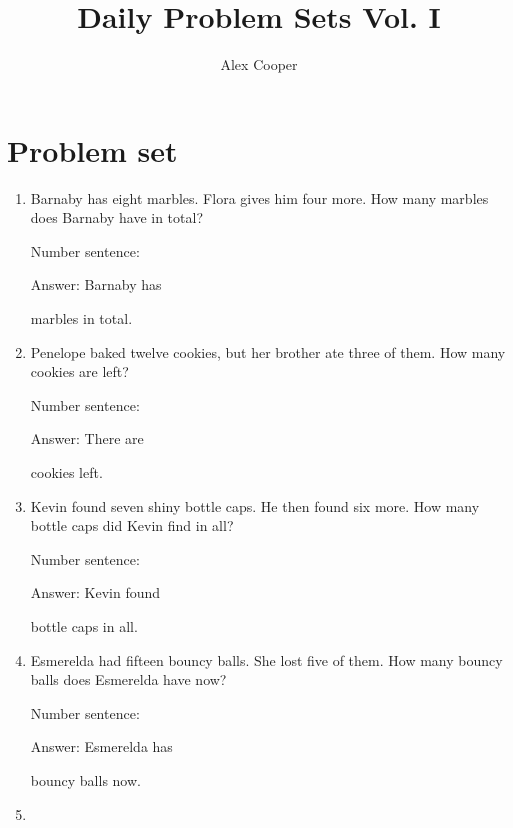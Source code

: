 \documentclass{tufte-book}
\title{Daily Problem Sets Vol. I}
\author[Alex Cooper]{Alex Cooper}
\begin{document}
\frontmatter

\maketitle


\clearpage\section{Problem set }

\begin{enumerate}

\item
  Barnaby has eight marbles. Flora gives him four more. How many marbles
  does Barnaby have in total?\medskip\par
  Number sentence:
  \dotfill\medskip\par
  Answer: Barnaby has
  \dotfill\medskip\par\mbox{}\dotfill\medskip\par\mbox{}\dotfill\bigskip
  marbles in total.
\item
  Penelope baked twelve cookies, but her brother ate three of them. How
  many cookies are left?\medskip\par
  Number sentence:
  \dotfill\medskip\par
  Answer: There are
  \dotfill\medskip\par\mbox{}\dotfill\medskip\par\mbox{}\dotfill\bigskip
  cookies left.
\item
  Kevin found seven shiny bottle caps. He then found six more. How many
  bottle caps did Kevin find in all?\medskip\par
  Number sentence:
  \dotfill\medskip\par
  Answer: Kevin found
  \dotfill\medskip\par\mbox{}\dotfill\medskip\par\mbox{}\dotfill\bigskip
  bottle caps in all.
\item
  Esmerelda had fifteen bouncy balls. She lost five of them. How many
  bouncy balls does Esmerelda have now?\medskip\par
  Number sentence:
  \dotfill\medskip\par
  Answer: Esmerelda has
  \dotfill\medskip\par\mbox{}\dotfill\medskip\par\mbox{}\dotfill\bigskip
  bouncy balls now.
\item

\end{enumerate}
\end{document}
